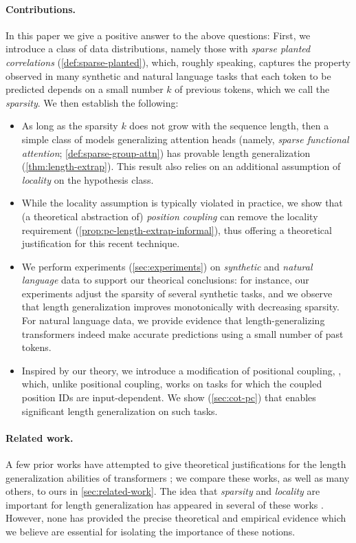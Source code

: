 \documentclass{article}
\newcommand{\icml}[1]{\iftoggle{icml}{#1}{}}
\begin{document}
\paragraph{Contributions.} In this paper we give a positive answer to the above questions: First, we introduce a class of data distributions, namely those with \emph{sparse planted correlations} (\cref{def:sparse-planted}), which, roughly speaking, captures the property observed in many synthetic and natural language tasks that each token to be predicted depends on a small number $k$ of previous tokens, which we call the \emph{sparsity}. We then establish the following: 
\begin{itemize}\icml{[itemsep=0.0em,topsep=0.0em,leftmargin=0.25cm,rightmargin=0cm]}%
\item As long as the sparsity $k$ does not grow with the sequence length, then a simple class of models generalizing attention heads (namely, \emph{sparse functional attention}; \cref{def:sparse-group-attn}) has provable length generalization (\cref{thm:length-extrap}). This result also relies on an additional assumption of \emph{locality} on the hypothesis class. 
\item While the locality assumption is typically violated in practice, we show that (a theoretical abstraction of) \emph{position coupling} can remove the locality requirement (\cref{prop:pc-length-extrap-informal}), thus offering a theoretical justification for this recent technique.
\item We perform experiments (\cref{sec:experiments}) on  \emph{synthetic} and \emph{natural language} data to support our theorical conclusions: for instance, our experiments adjust the sparsity of several synthetic tasks, and we observe that length generalization improves monotonically with decreasing sparsity. For natural language data, we provide evidence that length-generalizing transformers indeed make accurate predictions using a small number of past tokens. 
\item Inspired by our theory, we introduce a modification of positional coupling, \emph{\predpc}, which, unlike positional coupling, works on tasks for which the coupled position IDs are input-dependent. We show (\cref{sec:cot-pc}) that \predpc enables significant length generalization on such tasks. 
\end{itemize}

\paragraph{Related work.} A few prior works have attempted to give theoretical justifications for the length generalization abilities of transformers \cite{zhou_what_2023,huang_formal_2024,sabbaghi_explicitly_2024,ahuja_provable_2024}; we compare these works, as well as many others, to ours in \cref{sec:related-work}. 
The idea that \emph{sparsity} and \emph{locality} are important for length generalization has appeared in several of these works \cite{huang_formal_2024,sabbaghi_explicitly_2024}. However, none has provided the precise theoretical and empirical evidence which we believe are essential for isolating the importance of these notions. 
\end{document}

